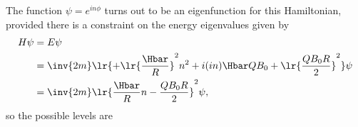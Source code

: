 %
The function \( \psi = e^{i n \phi} \) turns out to be an eigenfunction for this Hamiltonian, provided there is a constraint on the energy eigenvalues given by
%
\begin{equation}\label{eqn:gradQuantumProblemSet3Problem2:200}
\begin{aligned}
H \psi
&= E \psi
\\ &=
\inv{2 m}
\lr{
+\lr{ \frac{\Hbar}{R} }^2 n^2
+ i (i n) \Hbar Q B_0
+ \lr{ \frac{Q B_0 R}{2} }^2
} \psi
\\ &=
\inv{2 m}
\lr{ \frac{\Hbar}{R} n - \frac{Q B_0 R}{2} }^2 \psi,
\end{aligned}
\end{equation}
%
so the possible levels are
%
